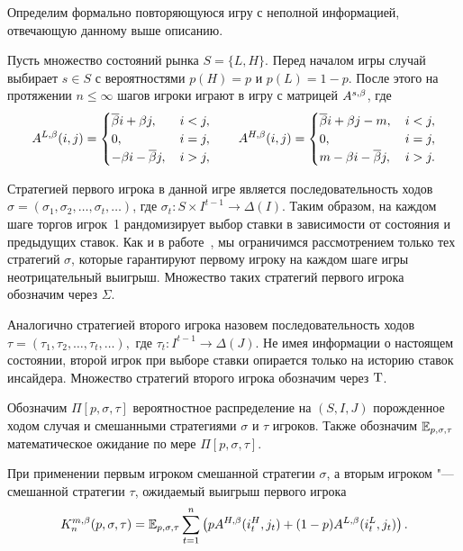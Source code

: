 {Определим формально повторяющуюся игру с неполной информацией, отвечающую данному выше описанию. 

Пусть множество состояний рынка $S = \{L, H\}$. Перед началом игры случай выбирает $s \in S $ с вероятностями $p(H) = p$ и $p(L) = 1 - p$.
После этого на протяжении $n \leq \infty$ шагов игроки играют в игру с матрицей $A^{s,\beta}$, где
\begin{equation*}
  A^{L,\beta}(i, j) = \begin{cases}
    {\overline{\beta}} i + \beta j, &\, i < j, \\
    0, &\, i = j, \\
    -\beta i - {\overline{\beta}} j, &\, i > j,
  \end{cases}
  \qquad
  A^{H,\beta}(i, j) = \begin{cases}
    {\overline{\beta}} i + \beta j - m, &\, i < j, \\
    0, &\, i = j, \\
    m - \beta i - {\overline{\beta}} j, &\, i > j.
  \end{cases}
\end{equation*}

Стратегией первого игрока в данной игре является последовательность ходов 
$\sigma = (\sigma_1, \sigma_2, \ldots, \sigma_t, \ldots)$, где 
$\sigma_t: S \times I^{t-1} \rightarrow \Delta(I)$.
Таким образом, на каждом шаге торгов игрок~1 рандомизирует выбор ставки в зависимости от состояния и предыдущих ставок.
Как и в работе~\cite{domansky07}, мы ограничимся рассмотрением только тех стратегий $\sigma$, которые гарантируют первому игроку на каждом шаге игры неотрицательный выигрыш.
Множество таких стратегий первого игрока обозначим через $\Sigma$.

Аналогично стратегией второго игрока назовем последовательность ходов 
$\tau = (\tau_1, \tau_2, \ldots, \tau_t, \ldots),$ где 
$\tau_t: I^{t-1} \rightarrow \Delta(J)$.
Не имея информации о настоящем состоянии, второй игрок при выборе ставки опирается только на историю ставок инсайдера.
Множество стратегий второго игрока обозначим через $\mathrm{T}$.

Обозначим $\Pi[p, \sigma, \tau]$ вероятностное распределение на $(S, I, J)$ порожденное ходом случая и смешанными стратегиями $\sigma$ и $\tau$ игроков.
Также обозначим $\operatorname{\mathbb{E}}_{p,\sigma,\tau}$ математическое ожидание по мере $\Pi[p, \sigma, \tau]$.

При применении первым игроком смешанной стратегии $\sigma$, а вторым игроком "--- смешанной стратегии $\tau$, ожидаемый выигрыш первого игрока
\begin{equation}
  \label{ch1:eq:firstPlayerPayoff}
  K^{m,\beta}_n(p, \sigma, \tau) = \operatorname{\mathbb{E}}_{p,\sigma,\tau} \sum_{t=1}^n
  \left(
    pA^{H,\beta}(i_t^H, j_t) + (1 - p)A^{L,\beta}(i_t^L, j_t)
  \right).
\end{equation}

}
